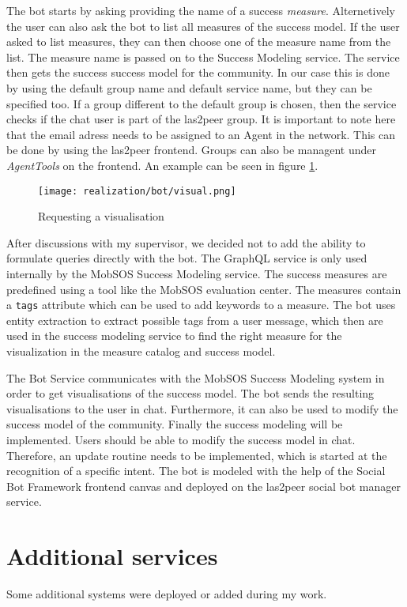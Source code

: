 The bot starts by asking providing the name of a success \emph{measure}. Alternetively the user can also ask the bot to list all measures of the success model.
If the user asked to list measures, they can then choose one of the measure name from the list. 
The measure name is passed on to the Success Modeling service. The service then gets the success success model for the community. In our case this is done by using the default group name and default service name, but they can be specified too.
If a group different to the default group is chosen, then the service checks if the chat user is part of the las2peer group. It is important to note here that the email adress needs to be assigned to an Agent in the network. This can be done by using the las2peer frontend. Groups can also be managent under \emph{AgentTools} on the frontend.   
 An example can be seen in figure \ref{fig:visualReq}.
\begin{figure}[h]
    \centering
    \texttt{[image: realization/bot/visual.png]}
    \caption{Requesting a visualisation}
    \label{fig:visualReq}
\end{figure}

After discussions with my supervisor, we decided not to add the ability to formulate queries directly with the bot. The GraphQL service is only used internally by the MobSOS Success Modeling service. The success measures are predefined using a tool like the MobSOS evaluation center. The measures contain a \texttt{tags} attribute which can be used to add keywords to a measure. The bot uses entity extraction to extract possible tags from a user message, which then are used in the success modeling service to find the right measure for the visualization in the measure catalog and success model.

The Bot Service communicates with the MobSOS Success Modeling system in order to get visualisations of the success model. The bot sends the resulting visualisations to the user in chat.
Furthermore, it can also be used to modify the success model of the community. 
Finally the success modeling will be implemented. Users should be able
to modify the success model in chat. Therefore, an update routine needs to be implemented, which is started at the recognition of a specific intent.
The bot is modeled with the help of the Social Bot Framework frontend canvas and deployed on the las2peer social bot manager service.


\section{Additional services}\label{sec:additional}
Some additional systems were deployed or added during my work.


